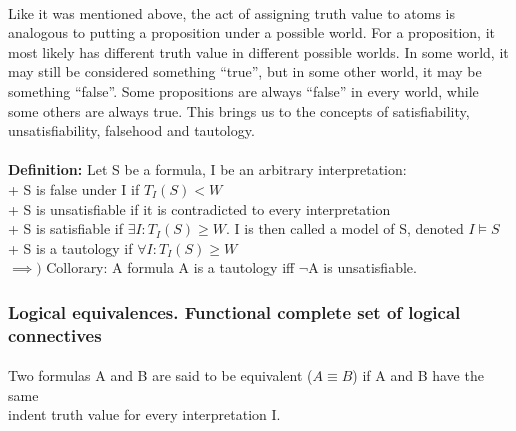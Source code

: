 \documentclass[part1.tex]{subfiles}
\begin{document}
\paragraph{} Like it was mentioned above, the act of assigning
truth value to atoms is analogous to putting a proposition under
a possible world. For a proposition, it most likely has different truth
value in different possible worlds. In some world, it may still
be considered something ``true'', but in some other world, it
may be something ``false''. Some propositions are always
``false'' in every world, while some others are always true.
This brings us to the concepts of
satisfiability, unsatisfiability, falsehood and tautology.\\\\
{\bfseries Definition:} Let S be a formula, I be an arbitrary interpretation:\\
\indent + S is false under I if \(T_I(S) < W\)\\
\indent + S is unsatisfiable if it is contradicted to every interpretation\\ 
\indent + S is satisfiable if \(\exists I: T_I(S) \ge W\). I is then called a model of S, denoted \(I \models S\)\\
\indent + S is a tautology if \(\forall I: T_I(S) \ge W\)\\
\indent \(\implies)\) Collorary: A formula A is a tautology iff \(\neg\)A is unsatisfiable.
\subsubsection{Logical equivalences. Functional complete set of logical connectives}
\paragraph{} Two formulas A and B are said to be equivalent (\(A \equiv B\)) if A and B have the same \\
indent truth value for every interpretation I.
\end{document}
